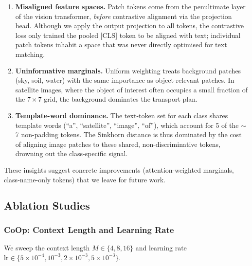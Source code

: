\documentclass[10pt,twocolumn,letterpaper]{article}
\begin{document}
\begin{enumerate}
  \item \textbf{Misaligned feature spaces.}  Patch tokens come from the
    penultimate layer of the vision transformer, \emph{before} contrastive
    alignment via the projection head.  Although we apply the output
    projection to all tokens, the contrastive loss only trained the pooled
    [CLS] token to be aligned with text; individual patch tokens inhabit
    a space that was never directly optimised for text matching.

  \item \textbf{Uninformative marginals.}  Uniform weighting treats
    background patches (sky, soil, water) with the same importance as
    object-relevant patches.  In satellite images, where the object of
    interest often occupies a small fraction of the $7 \times 7$ grid,
    the background dominates the transport plan.

  \item \textbf{Template-word dominance.}  The text-token set for each
    class shares template words (``a'', ``satellite'', ``image'', ``of''),
    which account for 5 of the $\sim$7 non-padding tokens.  The Sinkhorn
    distance is thus dominated by the cost of aligning image patches to
    these shared, non-discriminative tokens, drowning out the
    class-specific signal.
\end{enumerate}

These insights suggest concrete improvements (attention-weighted marginals,
class-name-only tokens) that we leave for future work.

\subsection{Ablation Studies}\label{sec:ablations}

\subsubsection{CoOp: Context Length and Learning Rate}

We sweep the context length $M \in \{4, 8, 16\}$ and learning rate
$\mathrm{lr} \in \{5 \times 10^{-4}, 10^{-3}, 2 \times 10^{-3},
5 \times 10^{-3}\}$.

\end{document}
